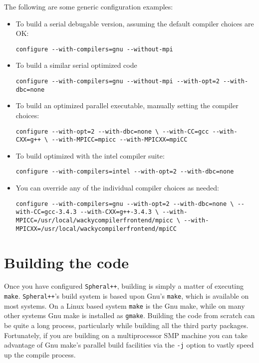 \documentclass{article}
\newcommand{\Spheral}{{\tt Spheral++}}
\begin{document}
The following are some generic configuration examples:

\begin{itemize}
\item To build a serial debugable version, assuming the default compiler choices are OK:
\begin{verbatim}
configure --with-compilers=gnu --without-mpi
\end{verbatim}

\item To build a similar serial optimized code
\begin{verbatim}
configure --with-compilers=gnu --without-mpi --with-opt=2 --with-dbc=none
\end{verbatim}

\item To build an optimized parallel executable, manually setting the compiler choices:
\begin{verbatim}
configure --with-opt=2 --with-dbc=none \ --with-CC=gcc --with-CXX=g++ \ --with-MPICC=mpicc --with-MPICXX=mpiCC
\end{verbatim}

\item To build optimized with the intel compiler suite:
\begin{verbatim}
configure --with-compilers=intel --with-opt=2 --with-dbc=none
\end{verbatim}

\item You can override any of the individual compiler choices as needed:
\begin{verbatim}
configure --with-compilers=gnu --with-opt=2 --with-dbc=none \ --with-CC=gcc-3.4.3 --with-CXX=g++-3.4.3 \ --with-MPICC=/usr/local/wackycompilerfrontend/mpicc \ --with-MPICXX=/usr/local/wackycompilerfrontend/mpiCC
\end{verbatim}

\end{itemize}

\section{Building the code}

Once you have configured \Spheral, building is simply a matter of executing {\tt make}.  \Spheral's build system is based upon Gnu's \verb+make+, which is available on most systems.  On a Linux based system \verb+make+ is the Gnu make, while on many other systems Gnu make is installed as \verb+gmake+.  Building the code from scratch can be quite a long process, particularly while building all the third party packages.  Fortunately, if you are building on a multiprocessor SMP machine you can take advantage of Gnu make's parallel build facilities via the \verb+-j+ option to vastly speed up the compile process.
\end{document}
